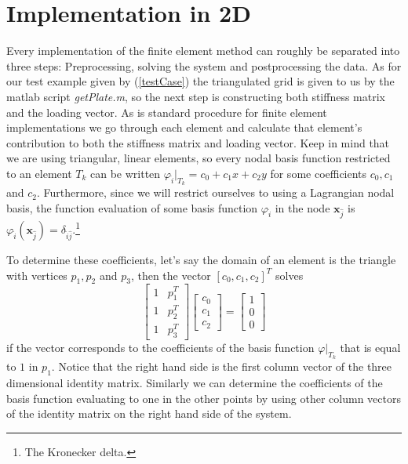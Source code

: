 \documentclass[paper=a4, fontsize=11pt]{scrartcl} %
\begin{document}
\section*{Implementation in 2D}
Every implementation of the finite element method can roughly be separated into three steps: Preprocessing, solving the system and postprocessing the data. As for our test example given by (\ref{testCase}) the triangulated grid is given to us by the matlab script \textit{getPlate.m}, so the next step is constructing both stiffness matrix and the loading vector. As is standard procedure for finite element implementations we go through each element and calculate that element's contribution to both the stiffness matrix and loading vector.  Keep in mind that we are using triangular, linear elements, so every nodal basis function restricted to an element $T_k$ can be written $\varphi_{\hat{i}}\big|_{T_k} = c_0 + c_1x+c_2y$ for some coefficients $c_0,c_1$ and $c_2$. Furthermore, since we will restrict ourselves to using a Lagrangian nodal basis, the function evaluation of some basis function $\varphi_{\hat{i}}$ in the node $\textbf{x}_{\hat{j}}$ is $\varphi_{\hat{i}}(\textbf{x}_{\hat{j}}) = \delta_{\hat{i}\hat{j}}$.\footnote{The Kronecker delta.}

To determine these coefficients, let's say the domain of an element is the triangle with vertices $p_1, p_2$ and $p_3$, then the vector $[c_0, c_1, c_2]^T$ solves
\begin{equation*}
\begin{bmatrix}
1 & p_1^T \\
1 & p_2^T \\
1 & p_3^T
\end{bmatrix}
\begin{bmatrix}
c_0 \\ c_1 \\ c_2
\end{bmatrix}
= \begin{bmatrix}
1 \\ 0 \\ 0
\end{bmatrix}
\end{equation*}
if the vector corresponds to the coefficients of the basis function $\varphi\big|_{T_k}$ that is equal to $1$ in $p_1$. Notice that the right hand side is the first column vector of the three dimensional identity matrix. Similarly we can determine the coefficients of the basis function evaluating to one in the other points by using other column vectors of the identity matrix on the right hand side of the system.
\end{document}
